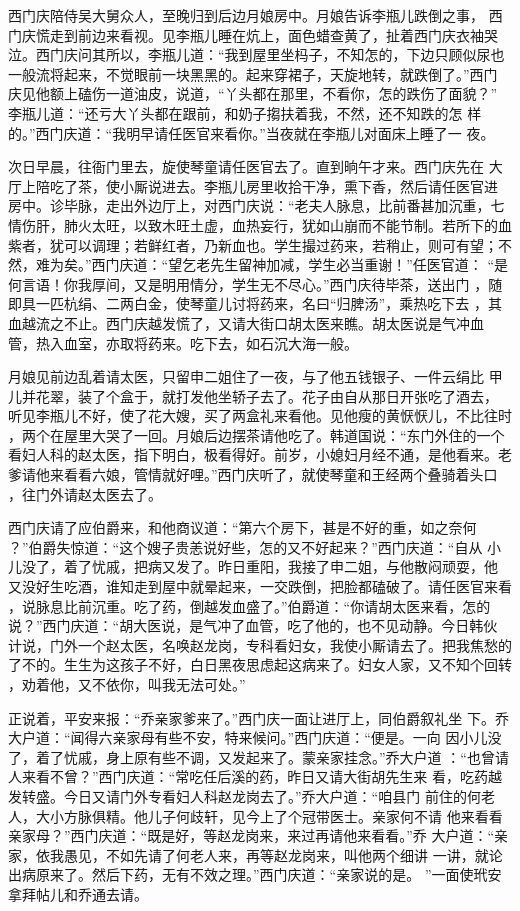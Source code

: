 西门庆陪侍吴大舅众人，至晚归到后边月娘房中。月娘告诉李瓶儿跌倒之事，
西门庆慌走到前边来看视。见李瓶儿睡在炕上，面色蜡查黄了，扯着西门庆衣袖哭
泣。西门庆问其所以，李瓶儿道：“我到屋里坐杩子，不知怎的，下边只顾似尿也
一般流将起来，不觉眼前一块黑黑的。起来穿裙子，天旋地转，就跌倒了。”西门
庆见他额上磕伤一道油皮，说道，“丫头都在那里，不看你，怎的跌伤了面貌？”
李瓶儿道：“还亏大丫头都在跟前，和奶子搊扶着我，不然，还不知跌的怎
样的。”西门庆道：“我明早请任医官来看你。”当夜就在李瓶儿对面床上睡了一
夜。

次日早晨，往衙门里去，旋使琴童请任医官去了。直到晌午才来。西门庆先在
大厅上陪吃了茶，使小厮说进去。李瓶儿房里收拾干净，熏下香，然后请任医官进
房中。诊毕脉，走出外边厅上，对西门庆说：“老夫人脉息，比前番甚加沉重，七
情伤肝，肺火太旺，以致木旺土虚，血热妄行，犹如山崩而不能节制。若所下的血
紫者，犹可以调理；若鲜红者，乃新血也。学生撮过药来，若稍止，则可有望；不
然，难为矣。”西门庆道：“望乞老先生留神加减，学生必当重谢！”任医官道：
“是何言语！你我厚间，又是明用情分，学生无不尽心。”西门庆待毕茶，送出门
，随即具一匹杭绢、二两白金，使琴童儿讨将药来，名曰“归脾汤”，乘热吃下去
，其血越流之不止。西门庆越发慌了，又请大街口胡太医来瞧。胡太医说是气冲血
管，热入血室，亦取将药来。吃下去，如石沉大海一般。

月娘见前边乱着请太医，只留申二姐住了一夜，与了他五钱银子、一件云绢比
甲儿并花翠，装了个盒于，就打发他坐轿子去了。花子由自从那日开张吃了酒去，
听见李瓶儿不好，使了花大嫂，买了两盒礼来看他。见他瘦的黄恹恹儿，不比往时
，两个在屋里大哭了一回。月娘后边摆茶请他吃了。韩道国说：“东门外住的一个
看妇人科的赵太医，指下明白，极看得好。前岁，小媳妇月经不通，是他看来。老
爹请他来看看六娘，管情就好哩。”西门庆听了，就使琴童和王经两个叠骑着头口
，往门外请赵太医去了。

西门庆请了应伯爵来，和他商议道：“第六个房下，甚是不好的重，如之奈何
？”伯爵失惊道：“这个嫂子贵恙说好些，怎的又不好起来？”西门庆道：“自从
小儿没了，着了忧戚，把病又发了。昨日重阳，我接了申二姐，与他散闷顽耍，他
又没好生吃酒，谁知走到屋中就晕起来，一交跌倒，把脸都磕破了。请任医官来看
，说脉息比前沉重。吃了药，倒越发血盛了。”伯爵道：“你请胡太医来看，怎的
说？”西门庆道：“胡大医说，是气冲了血管，吃了他的，也不见动静。今日韩伙
计说，门外一个赵太医，名唤赵龙岗，专科看妇女，我使小厮请去了。把我焦愁的
了不的。生生为这孩子不好，白日黑夜思虑起这病来了。妇女人家，又不知个回转
，劝着他，又不依你，叫我无法可处。”

正说着，平安来报：“乔亲家爹来了。”西门庆一面让进厅上，同伯爵叙礼坐
下。乔大户道：“闻得六亲家母有些不安，特来候问。”西门庆道：“便是。一向
因小儿没了，着了忧戚，身上原有些不调，又发起来了。蒙亲家挂念。”乔大户道
：“也曾请人来看不曾？”西门庆道：“常吃任后溪的药，昨日又请大街胡先生来
看，吃药越发转盛。今日又请门外专看妇人科赵龙岗去了。”乔大户道：“咱县门
前住的何老人，大小方脉俱精。他儿子何歧轩，见今上了个冠带医士。亲家何不请
他来看看亲家母？”西门庆道：“既是好，等赵龙岗来，来过再请他来看看。”乔
大户道：“亲家，依我愚见，不如先请了何老人来，再等赵龙岗来，叫他两个细讲
一讲，就论出病原来了。然后下药，无有不效之理。”西门庆道：“亲家说的是。
”一面使玳安拿拜帖儿和乔通去请。

